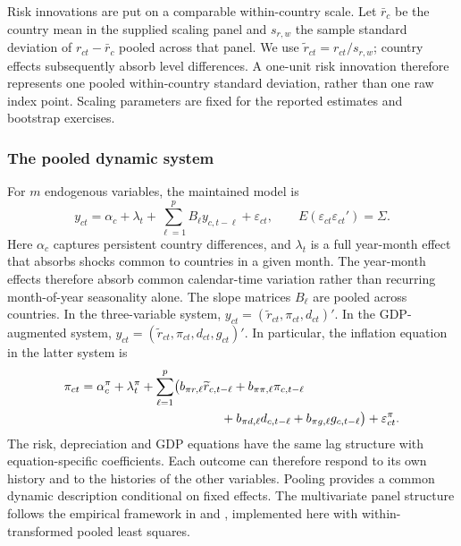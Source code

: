 Risk innovations are put on a comparable within-country scale. Let $\bar r_c$ be the country mean in the supplied scaling panel and $s_{r,w}$ the sample standard deviation of $r_{ct}-\bar r_c$ pooled across that panel. We use $\widetilde r_{ct}=r_{ct}/s_{r,w}$; country effects subsequently absorb level differences. A one-unit risk innovation therefore represents one pooled within-country standard deviation, rather than one raw index point. Scaling parameters are fixed for the reported estimates and bootstrap exercises.

\subsubsection{The pooled dynamic system}
For $m$ endogenous variables, the maintained model is
\begin{equation}
 y_{ct}=\alpha_c+\lambda_t+\sum_{\ell=1}^{p}B_\ell y_{c,t-\ell}+\varepsilon_{ct},\qquad
 E(\varepsilon_{ct}\varepsilon_{ct}')=\Sigma.\label{eq:pvar}
\end{equation}
Here $\alpha_c$ captures persistent country differences, and $\lambda_t$ is a full year-month effect that absorbs shocks common to countries in a given month. The year-month effects therefore absorb common calendar-time variation rather than recurring month-of-year seasonality alone. The slope matrices $B_\ell$ are pooled across countries. In the three-variable system, $y_{ct}=(\widetilde r_{ct},\pi_{ct},d_{ct})'$. In the GDP-augmented system, $y_{ct}=(\widetilde r_{ct},\pi_{ct},d_{ct},g_{ct})'$. In particular, the inflation equation in the latter system is
\begin{align}
 \pi_{ct}={}&\alpha_c^\pi+\lambda_t^\pi+
 \sum_{\ell=1}^{p}\bigl(b_{\pi r,\ell}\widetilde r_{c,t-\ell}
 +b_{\pi\pi,\ell}\pi_{c,t-\ell}\notag\\
 &\hspace{35mm}+b_{\pi d,\ell}d_{c,t-\ell}
 +b_{\pi g,\ell}g_{c,t-\ell}\bigr)+\varepsilon_{ct}^\pi.\label{eq:inflation_equation}
\end{align}
The risk, depreciation and GDP equations have the same lag structure with equation-specific coefficients. Each outcome can therefore respond to its own history and to the histories of the other variables. Pooling provides a common dynamic description conditional on fixed effects. The multivariate panel structure follows the empirical framework in \citet{love2006} and \citet{abrigo2016}, implemented here with within-transformed pooled least squares.

